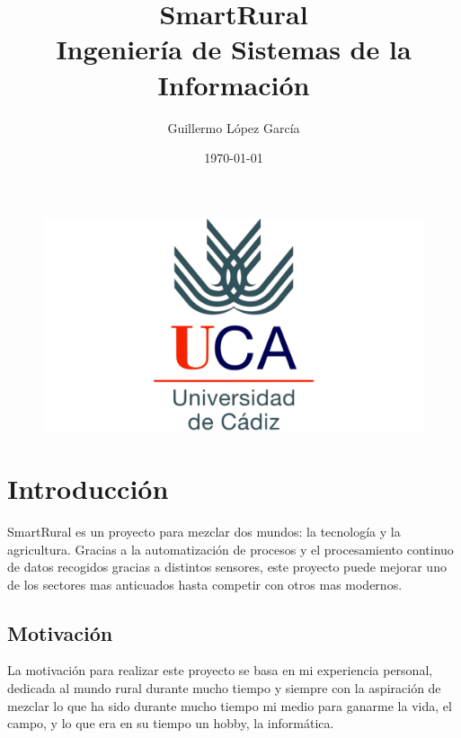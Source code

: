 \documentclass[a4paper,12pt]{article}
\title{\textbf{
  SmartRural
} \\ \small Ingeniería de Sistemas de la Información}
\author{Guillermo López García}
\date{\today}
\begin{document}
\maketitle

\begin{figure}[ht]
    \centering
	\includegraphics[scale=0.1]{uca.png}
\end{figure}

\clearpage

\tableofcontents
\clearpage

\section{Introducción}
SmartRural es un proyecto para mezclar dos mundos: la tecnología y la agricultura.
Gracias a la automatización de procesos y el procesamiento continuo de datos recogidos gracias a distintos sensores,
este proyecto puede mejorar uno de los sectores mas anticuados hasta competir con otros mas modernos.

\subsection{Motivación}
La motivación para realizar este proyecto se basa en mi experiencia personal, dedicada al mundo rural durante mucho
tiempo y siempre con la aspiración de mezclar lo que ha sido durante mucho tiempo mi medio para ganarme la vida,
el campo, y lo que era en su tiempo un hobby, la informática.
\end{document}

